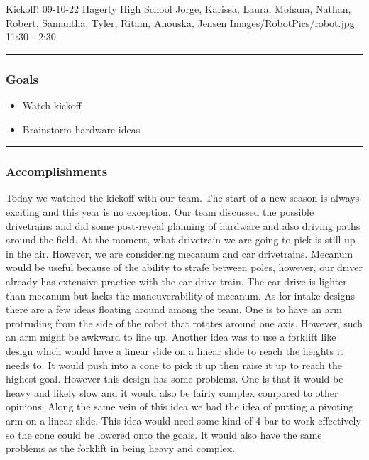 \insertmeeting 
	{Kickoff!} 
	{09-10-22} 
	{Hagerty High School}
	{Jorge, Karissa, Laura, Mohana, Nathan, Robert, Samantha, Tyler, Ritam, Anouska, Jensen}
	{Images/RobotPics/robot.jpg}
	{11:30 - 2:30}
	
\noindent\hfil\rule{\textwidth}{.4pt}\hfil
\subsubsection*{Goals}
\begin{itemize}
    \item Watch kickoff
    \item Brainstorm hardware ideas

\end{itemize} 

\noindent\hfil\rule{\textwidth}{.4pt}\hfil

\subsubsection*{Accomplishments}
Today we watched the kickoff with our team. The start of a new season is always exciting and this year is no exception. Our team discussed the possible drivetrains and did some post-reveal planning of hardware and also driving paths around the field. At the moment, what drivetrain we are going to pick is still up in the air. However, we are considering mecanum and car drivetrains. Mecanum would be useful because of the ability to strafe between poles, however, our driver already has extensive practice with the car drive train. The car drive is lighter than mecanum but lacks the maneuverability of mecanum. As for intake designs there are a few ideas floating around among the team. One is to have an arm protruding from the side of the robot that rotates around one axis. 
However, such an arm might be awkward to line up. Another idea was to use a forklift like design which would have a linear slide on a linear slide to reach the heights it needs to. It would push into a cone to pick it up then raise it up to reach the highest goal. However this design has some problems. One is that it would be heavy and likely slow and it would also be fairly complex compared to other opinions. Along the same vein of this idea we had the idea of putting a pivoting arm on a linear slide. This idea would need some kind of 4 bar to work effectively so the cone could be lowered onto the goals. It would also have the same problems as the forklift in being heavy and complex.



